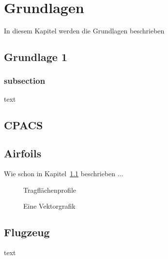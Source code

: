 \chapter{Grundlagen}\label{chp:Grundlageb}
In diesem Kapitel werden die Grundlagen beschrieben

\section{Grundlage 1}\label{sec:Grundlage1}
\subsection{subsection}
text

\section{CPACS}

\section{Airfoils}
Wie schon in Kapitel~\ref{sec:Grundlage1} beschrieben ...

\begin{figure}[htpb]
	\centering
		
	\caption{Tragfl\"achenprofile\footnotemark}
	\label{fig:airfoil_general}
\end{figure}

\blindtext

\begin{figure}[htpb]
	\centering
		
	\caption{Eine Vektorgrafik}
	\label{fig:vectorExample}
\end{figure}
\blindtext

\section{Flugzeug}
text \cite{bib:naca_docu}